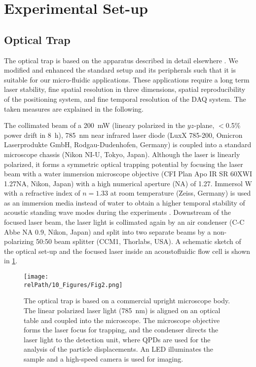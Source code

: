 \section{Experimental Set-up\label{sec:VT-experimentalSetUp}}
\subsection{Optical Trap\label{sec:VT-opticalTrap}}

The optical trap is based on the apparatus described in detail elsewhere 
\cite{Bodensiek2013}. We modified and enhanced the standard setup and its 
peripherals such that it is suitable for our micro-fluidic applications. These 
applications require a long term laser stability, fine spatial resolution in 
three dimensions, spatial reproducibility of the positioning system, and fine 
temporal resolution of the DAQ system. The taken measures are explained in the 
following.

The collimated beam of a \SI{200}{\milli\watt} (lineary polarized in the 
$yz$-plane, $<$0.5\% power drift in \SI{8}{\hour}), \SI{785}{\nano\meter} near 
infrared laser diode (LuxX 785-200, Omicron Laserprodukte GmbH, 
Rodgau-Dudenhofen, Germany) is coupled into a standard microscope chassis (Nikon 
NI-U, Tokyo, Japan).  Although the laser is linearly polarized, it forms a 
symmetric optical trapping potential by focusing the laser beam with a water 
immersion microscope objective (CFI Plan Apo IR SR 60XWI 1.27NA, Nikon, Japan) 
with a high numerical aperture (NA) of 1.27. Immersol W with a refractive index 
of $n=1.33$ at room temperature (Zeiss, Germany) is used as an immersion media 
instead of water to obtain a higher temporal stability of acoustic standing wave 
modes during the experiments \cite{Lamprecht20132016}.  Downstream of the focused 
laser beam, the laser light is collimated again by an air condenser (C-C Abbe NA 
0.9, Nikon, Japan) and split into two separate beams by a non-polarizing 50:50 
beam splitter (CCM1, Thorlabs, USA). A schematic sketch of the optical set-up 
and the focused laser inside an acoustofluidic flow cell is shown in 
\cref{fig:VT-Fig2}.

\begin{figure}[tb]
    \centering
    \texttt{[image: \\relPath/10\_Figures/Fig2.png]}
    \caption{The optical trap is based on a commercial upright microscope body.  
        The linear polarized laser light (\SI{785}{\nano\meter}) is aligned on 
        an optical table and coupled into the microscope. The microscope 
        objective forms the laser focus for trapping, and the condenser directs 
    the laser light to the detection unit, where QPDs are used for the analysis 
  of the particle displacements. An LED illuminates the sample and a high-speed 
camera is used for imaging.\label{fig:VT-Fig2}}
\end{figure}%

